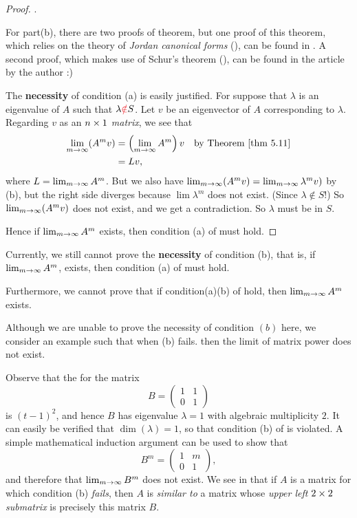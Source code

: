 \begin{proof}
.

For part(b), there are two proofs of theorem, but one proof of this theorem, which relies on the theory of \emph{Jordan canonical forms} (), can be found in .
A second proof, which makes use of Schur's theorem (), can be found in the article by the author :)

The \textbf{necessity} of condition (a) is easily justified.
For suppose that \(\lambda\) is an eigenvalue of \(A\) such that \(\lambda \RED{\notin} S\).
Let \(v\) be an eigenvector of \(A\) corresponding to \(\lambda\).
Regarding \(v\) as an \(n \times 1\) \emph{matrix}, we see that
\begin{align*}
    \lim_{m \toINF} (A^m v) & = \left( \lim_{m \toINF} A^m \right) v & \text{by \THM{5.11}} \\
        & = Lv,
\end{align*}
where \(L = \lim_{m \to \infty} A^m\).
But we also have \(\lim_{m \to \infty} (A^mv) = \lim_{m \to \infty} \lambda^m v)\) by (b),
but the right side diverges because \(\lim \lambda^m\) does not exist. (Since \(\lambda \notin S\)!)
So \(\lim_{m \to \infty} (A^mv)\) does not exist, and we get a contradiction.
So \(\lambda\) must be in \(S\).

Hence if \(\lim_{m \to \infty} A^m\) exists, then condition (a) of  must hold.
\end{proof}

\begin{remark} \label{remark 5.3.3}
Currently, we still cannot prove the \textbf{necessity} of condition (b),
that is, if \(\lim_{m \to \infty} A^m\), exists, then condition (a) of  must hold.

Furthermore, we cannot prove that if condition(a)(b) of  hold, then \(\lim_{m \to \infty} A^m\) exists.

Although we are unable to prove the necessity of condition \((b)\) here, we consider an example such that when (b) fails. then the limit of matrix power does not exist.

Observe that the \CPOLY{} for the matrix
\[
    B = \begin{pmatrix} 1 & 1 \\ 0 & 1 \end{pmatrix}
\]
is \((t - 1)^2\), and hence \(B\) has eigenvalue \(\lambda = 1\) with algebraic multiplicity \(2\).
It can easily be verified that \(\dim(\lambda) = 1\), so that condition (b) of  is violated.
A simple mathematical induction argument can be used to show that
\[
    B^m = \begin{pmatrix} 1 & m \\ 0 & 1 \end{pmatrix},
\]
and therefore that \(\lim_{m \to \infty} B^m\) does not exist.
We see in  that if \(A\) is a matrix for which condition (b) \emph{fails}, then \(A\) is \emph{similar to} a matrix whose \emph{upper left \(2 \times 2\) submatrix} is precisely this matrix \(B\).
\end{remark}

